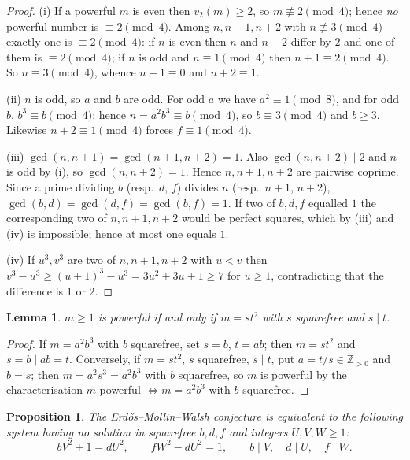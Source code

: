 \documentclass[11pt]{article}
\newtheorem{proposition}[theorem]{Proposition}
\newtheorem{lemma}[theorem]{Lemma}
\theoremstyle{definition}
\begin{document}
\begin{proof}
(i) If a powerful $m$ is even then $v_2(m)\ge2$, so $m\not\equiv2\pmod4$; hence
\emph{no} powerful number is $\equiv2\pmod4$. Among $n,n+1,n+2$ with
$n\not\equiv3\pmod4$ exactly one is $\equiv2\pmod4$: if $n$ is even then $n$ and
$n+2$ differ by $2$ and one of them is $\equiv2\pmod4$; if $n$ is odd and
$n\equiv1\pmod4$ then $n+1\equiv2\pmod4$. So $n\equiv3\pmod4$, whence
$n+1\equiv0$ and $n+2\equiv1$.

(ii) $n$ is odd, so $a$ and $b$ are odd. For odd $a$ we have $a^2\equiv1\pmod8$,
and for odd $b$, $b^3\equiv b\pmod4$; hence $n=a^2b^3\equiv b\pmod4$, so
$b\equiv3\pmod4$ and $b\ge3$. Likewise $n+2\equiv1\pmod4$ forces
$f\equiv1\pmod4$.

(iii) $\gcd(n,n+1)=\gcd(n+1,n+2)=1$. Also $\gcd(n,n+2)\mid 2$ and $n$ is odd by (i),
so $\gcd(n,n+2)=1$. Hence $n,n+1,n+2$ are pairwise coprime. Since a prime dividing
$b$ (resp.\ $d$, $f$) divides $n$ (resp.\ $n+1$, $n+2$), $\gcd(b,d)=\gcd(d,f)=
\gcd(b,f)=1$. If two of $b,d,f$ equalled $1$ the corresponding two of
$n,n+1,n+2$ would be perfect squares, which by (iii) and (iv) is impossible; hence
at most one equals $1$.

(iv) If $u^3,v^3$ are two of $n,n+1,n+2$ with $u<v$ then $v^3-u^3\ge (u+1)^3-u^3
= 3u^2+3u+1\ge 7$ for $u\ge1$, contradicting that the difference is $1$ or $2$.
\end{proof}

\begin{lemma}\label{lem:st}
$m\ge1$ is powerful if and only if $m=st^2$ with $s$ squarefree and $s\mid t$.
\end{lemma}

\begin{proof}
If $m=a^2b^3$ with $b$ squarefree, set $s=b$, $t=ab$; then $m=st^2$ and
$s=b\mid ab=t$. Conversely, if $m=st^2$, $s$ squarefree, $s\mid t$, put
$a=t/s\in\mathbb Z_{>0}$ and $b=s$; then $m=a^2s^3=a^2b^3$ with $b$ squarefree,
so $m$ is powerful by the characterisation $m$ powerful $\iff m=a^2b^3$ with $b$
squarefree.
\end{proof}

\begin{proposition}\label{prop:pell}
The Erdős--Mollin--Walsh conjecture is equivalent to the following system having no
solution in squarefree $b,d,f$ and integers $U,V,W\ge1$:
\[
bV^2+1=dU^2,\qquad fW^2-dU^2=1,\qquad b\mid V,\quad d\mid U,\quad f\mid W .
\]
\end{proposition}
\end{document}

